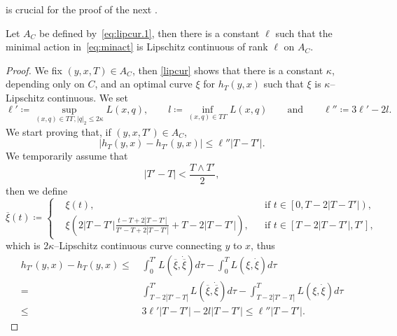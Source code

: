 \documentclass[11pt,a4paper,american]{article}
\newcommand{\ovxi}{\overline\xi}
\begin{document}
     is crucial for the proof of the next .

    \begin{prop}\label{minactlip}
        Let $A_C$ be defined by~\cref{eq:lipcur.1}, then there is a constant $\ell$ such that the minimal action in~\cref{eq:minact} is Lipschitz continuous of rank $\ell$ on $A_C$.
    \end{prop}
    \begin{proof}
        We fix $(y,x,T)\in A_C$, then \cref{lipcur} shows that there is a constant $\kappa$, depending only on $C$, and an optimal curve $\xi$ for $h_T(y,x)$ such that $\xi$ is $\kappa$--Lipschitz continuous. We set
        \begin{equation*}
            \ell'\coloneqq\sup_{(x,q)\in T\Gamma,|q|_2\le2\kappa}L(x,q),\qquad l\coloneqq\inf_{(x,q)\in T\Gamma}L(x,q)\qquad\text{and}\qquad\ell''\coloneqq3\ell'-2l.
        \end{equation*}
        We start proving that, if $(y,x,T')\in A_C$,
        \begin{equation}\label{eq:minactlip1}
            |h_T(y,x)-h_{T'}(y,x)|\le\ell''\left|T-T'\right|.
        \end{equation}
        We temporarily assume that
        \begin{equation}\label{eq:minactlip2}
            \left|T'-T\right|<\frac{T\wedge T'}2,
        \end{equation}
        then we define
        \begin{equation*}
            \ovxi(t)\coloneqq\left\{
            \begin{aligned}
                &\xi(t),&&\text{if }t\in\left[0,T-2\left|T-T'\right|\right),\\
                &\xi\left(2\left|T-T'\right|\frac{t-T+2|T-T'|}{T'-T+2|T-T'|}+T-2\left|T-T'\right|\right),&&\text{if }t\in\left[T-2\left|T-T'\right|,T'\right],
            \end{aligned}
            \right.
        \end{equation*}
        which is $2\kappa$--Lipschitz continuous curve connecting $y$ to $x$, thus
        \begin{align*}
            h_{T'}(y,x)-h_T(y,x)\le\,&\int_0^{T'}L\left(\ovxi,\dot\ovxi\right)d\tau-\int_0^T L\left(\xi,\dot\xi\right)d\tau\\
            =\,&\int_{T-2|T'-T|}^{T'}L\left(\ovxi,\dot\ovxi\right)d\tau-\int_{T-2|T'-T|}^T L\left(\xi,\dot\xi\right)d\tau\\
            \le\,&3\ell'\left|T-T'\right|-2l\left|T-T'\right|\le\ell''\left|T-T'\right|.

\end{align*}
\end{proof}
\end{document}
